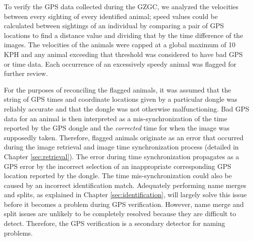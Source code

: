 To verify the GPS data collected during the GZGC, we analyzed the velocities between every sighting of every identified animal; speed values could be calculated between sightings of an individual by comparing a pair of GPS locations to find a distance value and dividing that by the time difference of the images.  The velocities of the animals were capped at a global maximum of  10 KPH and any animal exceeding that threshold was considered to have bad GPS or time data.  Each occurrence of an excessively speedy animal was flagged for further review.

For the purposes of reconciling the flagged animals, it was assumed that the string of GPS times and coordinate locations given by a particular dongle was reliably accurate and that the dongle was not otherwise malfunctioning.  Bad GPS data for an animal is then interpreted as a mis-synchronization of the time reported by the GPS dongle and the \textit{corrected} time for when the image was supposedly taken.   Therefore, flagged animals originate as an error that occurred during the image retrieval and image time synchronization process (detailed in Chapter \ref{sec:retrieval}).  The error during time synchronization propagates as a GPS error by the incorrect selection of an inappropriate corresponding GPS location reported by the dongle.  The time mis-synchronization could also be caused by an incorrect identification match.  Adequately performing name merges and splits, as explained in Chapter \ref{sec:identification}, will largely solve this issue before it becomes a problem during GPS verification.  However, name merge and split issues are unlikely to be completely resolved because they are difficult to detect.  Therefore, the GPS verification is a secondary detector for naming problems.  

